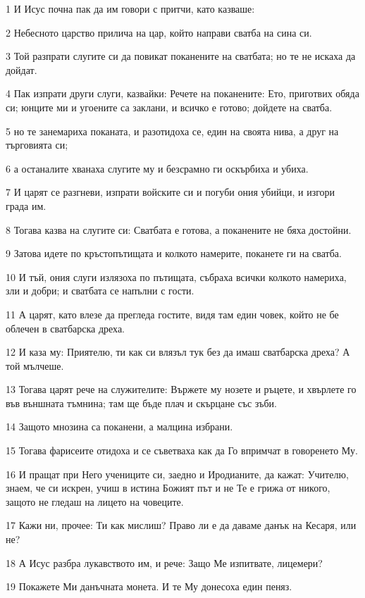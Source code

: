 \par 1 И Исус почна пак да им говори с притчи, като казваше:
\par 2 Небесното царство прилича на цар, който направи сватба на сина си.
\par 3 Той разпрати слугите си да повикат поканените на сватбата; но те не искаха да дойдат.
\par 4 Пак изпрати други слуги, казвайки: Речете на поканените: Ето, приготвих обяда си; юнците ми и угоените са заклани, и всичко е готово; дойдете на сватба.
\par 5 но те занемариха поканата, и разотидоха се, един на своята нива, а друг на търговията си;
\par 6 а останалите хванаха слугите му и безсрамно ги оскърбиха и убиха.
\par 7 И царят се разгневи, изпрати войските си и погуби ония убийци, и изгори града им.
\par 8 Тогава казва на слугите си: Сватбата е готова, а поканените не бяха достойни.
\par 9 Затова идете по кръстопътищата и колкото намерите, поканете ги на сватба.
\par 10 И тъй, ония слуги излязоха по пътищата, събраха всички колкото намериха, зли и добри; и сватбата се напълни с гости.
\par 11 А царят, като влезе да прегледа гостите, видя там един човек, който не бе облечен в сватбарска дреха.
\par 12 И каза му: Приятелю, ти как си влязъл тук без да имаш сватбарска дреха? А той мълчеше.
\par 13 Тогава царят рече на служителите: Вържете му нозете и ръцете, и хвърлете го във външната тъмнина; там ще бъде плач и скърцане със зъби.
\par 14 Защото мнозина са поканени, а малцина избрани.
\par 15 Тогава фарисеите отидоха и се съветваха как да Го впримчат в говоренето Му.
\par 16 И пращат при Него учениците си, заедно и Иродианите, да кажат: Учителю, знаем, че си искрен, учиш в истина Божият път и не Те е грижа от никого, защото не гледаш на лицето на човеците.
\par 17 Кажи ни, прочее: Ти как мислиш? Право ли е да даваме данък на Кесаря, или не?
\par 18 А Исус разбра лукавството им, и рече: Защо Ме изпитвате, лицемери?
\par 19 Покажете Ми данъчната монета. И те Му донесоха един пеняз.
